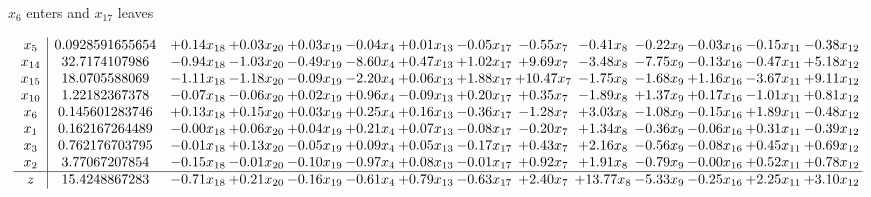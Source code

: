 \documentclass[8pt]{article}
\begin{document}
 $ x_{6} $ enters and $ x_{17} $ leaves 

 \[\begin{array}{c| c c@{\hskip 2pt} c@{\hskip 2pt} c@{\hskip 2pt} c@{\hskip 2pt} c@{\hskip 2pt} c@{\hskip 2pt} c@{\hskip 2pt} c@{\hskip 2pt} c@{\hskip 2pt} c@{\hskip 2pt} c@{\hskip 2pt} c@{\hskip 2pt} }
 x_{5}   &  0.0928591655654 & +  0.14 x_{18} & +  0.03 x_{20} & +  0.03 x_{19} & -0.04 x_{4} & +  0.01 x_{13} & -0.05 x_{17} & -0.55 x_{7} & -0.41 x_{8} & -0.22 x_{9} & -0.03 x_{16} & -0.15 x_{11} & -0.38 x_{12}\\
 x_{14}   &  32.7174107986 & -0.94 x_{18} & -1.03 x_{20} & -0.49 x_{19} & -8.60 x_{4} & +  0.47 x_{13} & +  1.02 x_{17} & +  9.69 x_{7} & -3.48 x_{8} & -7.75 x_{9} & -0.13 x_{16} & -0.47 x_{11} & +  5.18 x_{12}\\
 x_{15}   &  18.0705588069 & -1.11 x_{18} & -1.18 x_{20} & -0.09 x_{19} & -2.20 x_{4} & +  0.06 x_{13} & +  1.88 x_{17} & + 10.47 x_{7} & -1.75 x_{8} & -1.68 x_{9} & +  1.16 x_{16} & -3.67 x_{11} & +  9.11 x_{12}\\
 x_{10}   &  1.22182367378 & -0.07 x_{18} & -0.06 x_{20} & +  0.02 x_{19} & +  0.96 x_{4} & -0.09 x_{13} & +  0.20 x_{17} & +  0.35 x_{7} & -1.89 x_{8} & +  1.37 x_{9} & +  0.17 x_{16} & -1.01 x_{11} & +  0.81 x_{12}\\
 x_{6}   &  0.145601283746 & +  0.13 x_{18} & +  0.15 x_{20} & +  0.03 x_{19} & +  0.25 x_{4} & +  0.16 x_{13} & -0.36 x_{17} & -1.28 x_{7} & +  3.03 x_{8} & -1.08 x_{9} & -0.15 x_{16} & +  1.89 x_{11} & -0.48 x_{12}\\
 x_{1}   &  0.162167264489 & -0.00 x_{18} & +  0.06 x_{20} & +  0.04 x_{19} & +  0.21 x_{4} & +  0.07 x_{13} & -0.08 x_{17} & -0.20 x_{7} & +  1.34 x_{8} & -0.36 x_{9} & -0.06 x_{16} & +  0.31 x_{11} & -0.39 x_{12}\\
 x_{3}   &  0.762176703795 & -0.01 x_{18} & +  0.13 x_{20} & -0.05 x_{19} & +  0.09 x_{4} & +  0.05 x_{13} & -0.17 x_{17} & +  0.43 x_{7} & +  2.16 x_{8} & -0.56 x_{9} & -0.08 x_{16} & +  0.45 x_{11} & +  0.69 x_{12}\\
 x_{2}   &  3.77067207854 & -0.15 x_{18} & -0.01 x_{20} & -0.10 x_{19} & -0.97 x_{4} & +  0.08 x_{13} & -0.01 x_{17} & +  0.92 x_{7} & +  1.91 x_{8} & -0.79 x_{9} & -0.00 x_{16} & +  0.52 x_{11} & +  0.78 x_{12}\\
\hline
z    &  15.4248867283 & -0.71 x_{18} & +  0.21 x_{20} & -0.16 x_{19} & -0.61 x_{4} & +  0.79 x_{13} & -0.63 x_{17} & +  2.40 x_{7} & + 13.77 x_{8} & -5.33 x_{9} & -0.25 x_{16} & +  2.25 x_{11} & +  3.10 x_{12}\\
\end{array}\]
\end{document}
